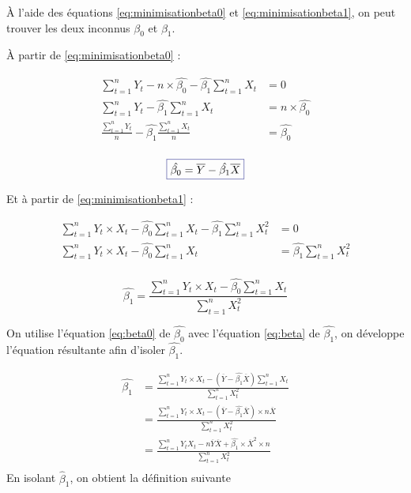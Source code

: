 \documentclass[11pt,french]{report}
\begin{document}
À l'aide des équations \ref{eq:minimisationbeta0} et \ref{eq:minimisationbeta1}, on peut trouver les deux inconnus $\beta_0$ et $\beta_1$.

\bigskip
À partir de \ref{eq:minimisationbeta0} :

\begin{align*}
\displaystyle\sum_{t=1}^n Y_t - n \times \hat{\beta_0} - \hat{\beta_1} \displaystyle\sum_{t=1}^n X_t &= 0 \\
\displaystyle\sum_{t=1}^n Y_t - \hat{\beta_1} \displaystyle\sum_{t=1}^n X_t &=  n \times \hat{\beta_0} \\
\frac{\displaystyle\sum_{t=1}^n Y_t}{n} - \hat{\beta_1} \frac{\displaystyle\sum_{t=1}^n X_t}{n} &=  \hat{\beta_0} \\
\end{align*}

\begin{equation}
\label{eq:beta0}
\color{Blue}
\boxed{\color{black}
\hat{\beta_0} = \overline{Y} - \hat{\beta_1} \overline{X}
}
\end{equation}

Et à partir de \ref{eq:minimisationbeta1} :

\begin{align*}
\displaystyle\sum_{t=1}^n Y_t \times X_t - \hat{\beta_0} \displaystyle\sum_{t=1}^n X_t - \hat{\beta_1} \displaystyle\sum_{t=1}^n X_t^2 &= 0 \\
\displaystyle\sum_{t=1}^n Y_t \times X_t - \hat{\beta_0} \displaystyle\sum_{t=1}^n X_t &=  \hat{\beta_1} \displaystyle\sum_{t=1}^n X_t^2 \\
\end{align*}

\begin{equation}
\label{eq:beta}
\hat{\beta_1} =  \frac{\displaystyle\sum_{t=1}^n Y_t \times X_t - \hat{\beta_0} \displaystyle\sum_{t=1}^n X_t}{\displaystyle\sum_{t=1}^n X_t^2}
\end{equation}

On utilise l'équation \ref{eq:beta0} de $\hat{\beta_0}$ avec l'équation \ref{eq:beta} de $\hat{\beta_1}$, on développe l'équation résultante afin d'isoler $\hat{\beta_1}$.

\begin{align*}
\hat{\beta_1} &= \frac{\displaystyle\sum_{t=1}^n Y_t \times X_t - (\overline{Y} - \hat{\beta_1}\overline{X})\displaystyle\sum_{t=1}^n X_t}{\displaystyle\sum_{t=1}^n X_t^2} \\
&= \frac{\displaystyle\sum_{t=1}^n Y_t \times X_t - (\overline{Y} - \hat{\beta_1}\overline{X})\times n \overline{X}}{\displaystyle\sum_{t=1}^n X_t^2} \\
&= \frac{\displaystyle\sum_{t=1}^n Y_t X_t - n\overline{Y}\overline{X} + \hat{\beta_1}\times \overline{X}^2 \times n}{\displaystyle\sum_{t=1}^n X_t^2} \\
\end{align*}
En isolant $\hat{\beta}_1$, on obtient la définition suivante
\end{document}
